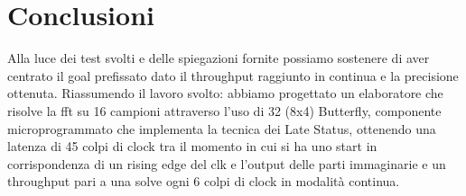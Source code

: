 \section{Conclusioni}
Alla luce dei test svolti e delle spiegazioni fornite possiamo sostenere di aver centrato il goal prefissato dato il throughput raggiunto in continua e la precisione ottenuta.
Riassumendo il lavoro svolto: abbiamo progettato un elaboratore che risolve la fft su 16 campioni attraverso l’uso di 32 (8x4) Butterfly, componente microprogrammato che implementa la tecnica dei Late Status, ottenendo una latenza di 45 colpi di clock tra il momento in cui si ha uno start in corrispondenza di un rising edge del clk e l’output delle parti immaginarie e un throughput pari a una solve ogni 6 colpi di clock in modalità continua.

